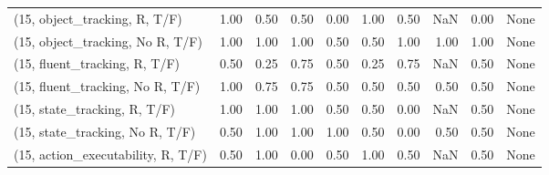 \begin{table*}[h!]
\begin{adjustbox}{width=2\columnwidth,center}
\begin{tabular}{lrrr|rrr|rrr}
\midrule
(15, object\_tracking, R, T/F)         &                      1.00 &                  0.50 &                      0.50 &                          0.00 &                      1.00 &                          0.50 &                                    NaN &                               0.00 &                                  None \\
(15, object\_tracking, No R, T/F)      &                      1.00 &                  1.00 &                      1.00 &                          0.50 &                      0.50 &                          1.00 &                                   1.00 &                               1.00 &                                  None \\
(15, fluent\_tracking, R, T/F)         &                      0.50 &                  0.25 &                      0.75 &                          0.50 &                      0.25 &                          0.75 &                                    NaN &                               0.50 &                                  None \\
(15, fluent\_tracking, No R, T/F)      &                      1.00 &                  0.75 &                      0.75 &                          0.50 &                      0.50 &                          0.50 &                                   0.50 &                               0.50 &                                  None \\
(15, state\_tracking, R, T/F)          &                      1.00 &                  1.00 &                      1.00 &                          0.50 &                      0.50 &                          0.00 &                                    NaN &                               0.50 &                                  None \\
(15, state\_tracking, No R, T/F)       &                      0.50 &                  1.00 &                      1.00 &                          1.00 &                      0.50 &                          0.00 &                                   0.50 &                               0.50 &                                  None \\
(15, action\_executability, R, T/F)    &                      0.50 &                  1.00 &                      0.00 &                          0.50 &                      1.00 &                          0.50 &                                    NaN &                               0.50 &                                  None \\

\end{tabular}
\end{adjustbox}
\end{table*}
